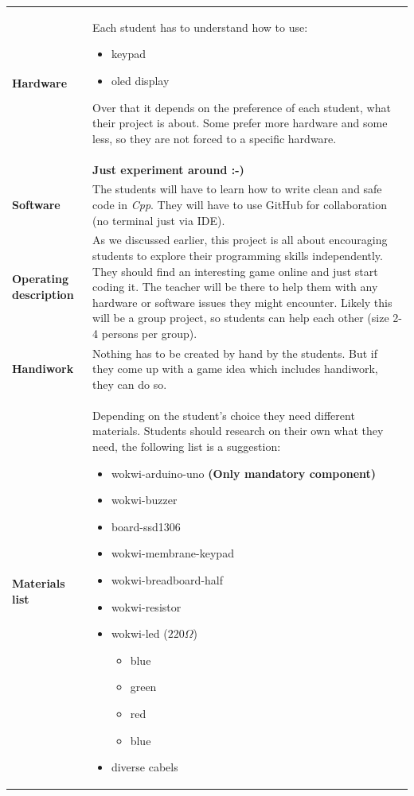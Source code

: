 \documentclass[10pt]{article}
\begin{document}
\begin{longtable}{|p{3.5cm}|p{11cm}|}
  \textbf{Hardware} & Each student has to understand how to use:
  \begin{itemize}
    \item keypad
    \item oled display
  \end{itemize} 
  Over that it depends on the preference of each student, what their project is about. Some prefer more hardware and some less, so they are not forced to a specific hardware. \\ & \textbf{Just experiment around :-)}
  \\ \hline
  
  \textbf{Software} & The students will have to learn how to write clean and safe code in \textit{Cpp}. They will have to use GitHub for collaboration (no terminal just via IDE).  \\ \hline
  
  \textbf{Operating description} & As we discussed earlier, this project is all about encouraging students to explore their programming skills independently. They should find an interesting game online and just start coding it. The teacher will be there to help them with any hardware or software issues they might encounter. Likely this will be a group project, so students can help each other (size 2-4 persons per group).
  \\ \hline
  
  \textbf{Handiwork} & Nothing has to be created by hand by the students. But if they come up with a game idea which includes handiwork, they can do so. \\ \hline
  
  \textbf{Materials list} & 
  Depending on the student's choice they need different materials. Students should research on their own what they need, the following list is a suggestion:
  \begin{itemize}
    \item wokwi-arduino-uno \textbf{(Only mandatory component)}
    \item wokwi-buzzer
    \item board-ssd1306
    \item wokwi-membrane-keypad
    \item wokwi-breadboard-half
    \item wokwi-resistor
    \item wokwi-led ($220 \Omega$)
    \begin{itemize}
      \item blue
      \item green
      \item red
      \item blue
    \end{itemize}
    \item diverse cabels
  \end{itemize}
  \\ \hline
  

\end{longtable}
\end{document}
